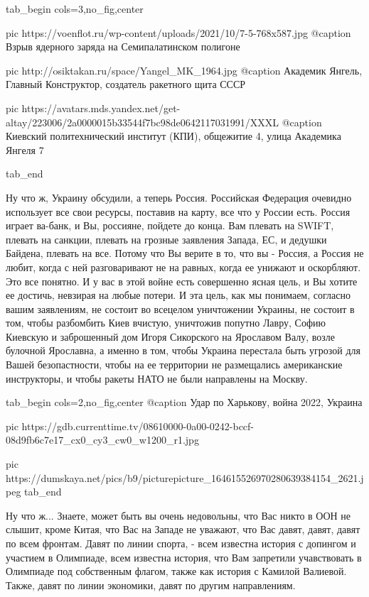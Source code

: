 \ifcmt
  tab_begin cols=3,no_fig,center

		 pic https://voenflot.ru/wp-content/uploads/2021/10/7-5-768x587.jpg
		 @caption Взрыв ядерного заряда на Семипалатинском полигоне

		 pic http://osiktakan.ru/space/Yangel_MK_1964.jpg
		 @caption Академик Янгель, Главный Конструктор, создатель ракетного щита СССР

		 pic https://avatars.mds.yandex.net/get-altay/223006/2a0000015b33544f7bc98de0642117031991/XXXL
		 @caption Киевский политехнический институт (КПИ), общежитие 4, улица Академика Янгеля 7

  tab_end
\fi

Ну что ж, Украину обсудили, а теперь Россия. Российская Федерация очевидно
использует все свои ресурсы, поставив на карту, все что у России есть. Россия
играет ва-банк, и Вы, россияне, пойдете до конца. Вам плевать на SWIFT, плевать
на санкции, плевать на грозные заявления Запада, ЕС, и дедушки Байдена, плевать
на все. Потому что Вы верите в то, что вы - Россия, а Россия не любит, когда с
ней разговаривают не на равных, когда ее унижают и оскорбляют. Это все понятно.
И у вас в этой войне есть совершенно ясная цель, и Вы хотите ее достичь,
невзирая на любые потери. И эта цель, как мы понимаем, согласно вашим
заявлениям, не состоит во всецелом уничтожении Украины, не состоит в том, чтобы
разбомбить Киев вчистую, уничтожив попутно Лавру, Софию Киевскую и заброшенный
дом Игоря Сикорского на Ярославом Валу, возле булочной Ярославна, а именно в
том, чтобы Украина перестала быть угрозой для Вашей безопастности, чтобы на ее
территории не размещались американские инструкторы, и чтобы ракеты НАТО не были
направлены на Москву.

\ifcmt
  tab_begin cols=2,no_fig,center
		 @caption Удар по Харькову, война 2022, Украина

     pic https://gdb.currenttime.tv/08610000-0a00-0242-bccf-08d9fb6c7e17_cx0_cy3_cw0_w1200_r1.jpg

		 pic https://dumskaya.net/pics/b9/picturepicture_164615526970280639384154_2621.jpeg
  tab_end
\fi

Ну что ж... Знаете, может быть вы очень недовольны, что Вас никто в ООН не
слышит, кроме Китая, что Вас на Западе не уважают, что Вас давят, давят, давят
по всем фронтам. Давят по линии спорта, - всем известна история с допингом и
участием в Олимпиаде, всем известна история, что Вам запретили учавствовать в
Олимпиаде под собственным флагом,  также как история с Камилой Валиевой. Также,
давят по линии экономики, давят по другим направлениям.

